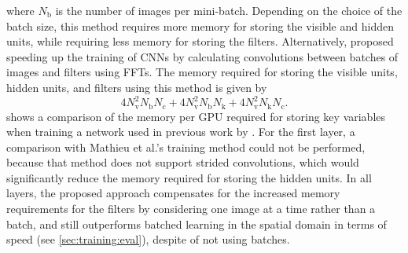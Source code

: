 where $N_\text{b}$ is the number of images per mini-batch. Depending on the
choice of the batch size, this method requires more memory for storing the
visible and hidden units, while requiring less memory for storing the filters.
Alternatively, \citet{mathieu2013} proposed speeding up the training of CNNs by
calculating convolutions between batches of images and filters using FFTs. The
memory required for storing the visible units, hidden units, and filters using
this method is given by
\begin{equation}
4 N_\text{v}^2 N_\text{b}N_\text{c} + 4
N_\text{v}^2 N_\text{b}N_\text{k} + 4 N_\text{v}^2 N_\text{k}N_\text{c}.
\end{equation}
 shows a comparison of the memory per GPU required for
storing key variables when training a network used in previous work by
\citet{krizhevsky2012}. For the first layer, a comparison with Mathieu et al.'s
training method could not be performed, because that method does not support
strided convolutions, which would significantly reduce the memory required for
storing the hidden units. In all layers, the proposed approach compensates for
the increased memory requirements for the filters by considering one image at a
time rather than a batch, and still outperforms batched learning in the spatial
domain in terms of speed (see \ref{sec:training:eval}), despite of not using
batches.


